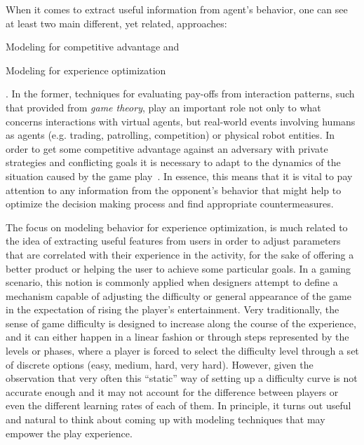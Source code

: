 When it comes to extract useful information from agent's behavior, one can see at least two main different, yet related, approaches: \begin{inparaenum}\item Modeling for competitive advantage and \item Modeling for experience optimization\end{inparaenum}. In the former, techniques for evaluating pay-offs from interaction patterns, such that provided from \textit{game theory}, play an important role not only to what concerns interactions with virtual agents, but real-world events involving humans as agents (e.g. trading, patrolling, competition) or physical robot entities. In order to get some competitive advantage against an adversary with private strategies and conflicting goals it is necessary to adapt to the dynamics of the situation caused by the game play~\citep{rofer_overview_2012}. In essence, this means that it is vital to pay attention to any information from the opponent's behavior that might help to optimize the decision making process and find appropriate countermeasures.

The focus on modeling behavior for experience optimization, is much related to the idea of extracting useful features from users in order to adjust parameters that are correlated with their experience in the activity, for the sake of offering a better product or helping the user to achieve some particular goals. In a gaming scenario, this notion is commonly applied when designers attempt to define a mechanism capable of adjusting the difficulty or general appearance of the game in the expectation of rising the player's entertainment. Very traditionally, the sense of game difficulty is designed to increase along the course of the experience, and it can either happen in a linear fashion or through steps represented by the levels or phases, where a player is forced to select the difficulty level through a set of discrete options (easy, medium, hard, very hard). However, given the observation that very often this ``static'' way of setting up a difficulty curve is not accurate enough and it may not account for the difference between players or even the different learning rates of each of them. In principle, it turns out useful and natural to think about coming up with modeling techniques that may empower the play experience. 


